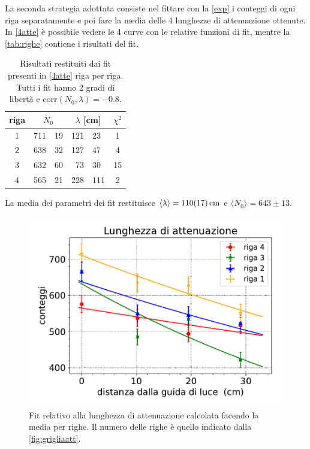 La seconda strategia adottata consiste nel fittare con la \eqref{exp} i conteggi di ogni riga separatamente e poi fare la media delle 4 lunghezze di attenuazione ottenute.
In \autoref{4atte} è possibile vedere le 4 curve con le relative funzioni di fit, mentre la \autoref{tab:righe} contiene i risultati del fit.

\begin{table}[h]
\centering
\begin{tabular}{| c | r @{$\pm$} l  | r @{$\pm$} l  | c |}
\hline
riga & \multicolumn{2}{c|}{$N_0$} & \multicolumn{2}{c|}{ $\lambda$ [\si{cm}] } & $\chi^2$  \\
\hline
1 & 711&19 & 121&23 & 1  \\
2 & 638&32 & 127&47 & 4 \\
3 & 632&60 & 73&30 & 15 \\
4 & 565&21 & 228&111 & 2 \\
\hline
\end{tabular}
\caption{Risultati restituiti dai fit presenti in \autoref{4atte} riga per riga. Tutti i fit hanno 2 gradi di libertà e corr$(N_0,\lambda)=-0.8$. }
\label{tab:righe}
\end{table}


La media dei parametri dei fit restituisce $\langle\lambda\rangle=\SI{110\pm17}{cm}$ e $\langle N_0\rangle=643\pm13$.
\begin{figure}[h]
\centering
\includegraphics[width=8 cm]{4atte}
\caption{Fit relativo alla lunghezza di attenuazione calcolata facendo la media per righe. Il numero delle righe è quello indicato dalla \autoref{fig:grigliaatt}.}
\label{4atte}
\end{figure}



